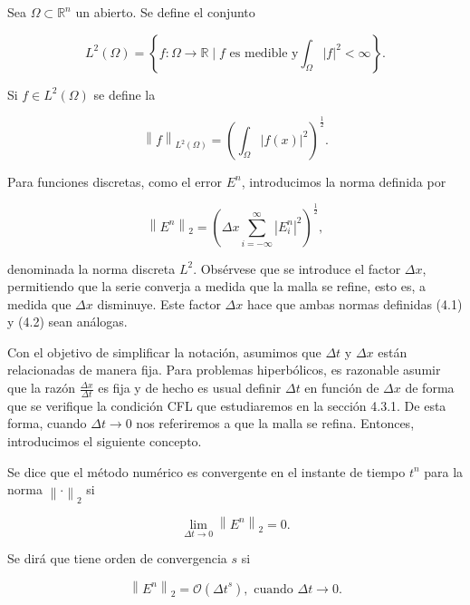 \begin{definition}
  Sea $\Omega\subset\mathbb{R}^{n}$ un abierto.
  Se define el conjunto

  \begin{equation*}
    L^{2}\left(\Omega\right)=
    \left\{
    f\colon\Omega\to\mathbb{R}\mid
    f\text{ es medible y}
    \int_{\Omega}\left|f\right|^{2}<\infty
    \right\}.
  \end{equation*}

  Si $f\in L^{2}\left(\Omega\right)$ se define la

  \begin{equation*}
    {\left\|f\right\|}_{L^{2}\left(\Omega\right)}=
      {\left(
        \int_{\Omega}
        \left|f\left(x\right)\right|^{2}
        \right)}^{\frac{1}{2}}.
  \end{equation*}
\end{definition}

Para funciones discretas, como el error $E^{n}$, introducimos la
norma definida por

\begin{equation*}
  {\left\|E^{n}\right\|}_{2}=
    {
      \left(
      \Delta x
      \sum_{i=-\infty}^{\infty}
      {\left|E^{n}_{i}\right|}^{2}
      \right)
    }^{\frac{1}{2}},
\end{equation*}

denominada la norma discreta $L^{2}$.
Obsérvese que se introduce el factor $\Delta x$, permitiendo que la
serie converja a medida que la malla se refine, esto es, a medida que
$\Delta x$ disminuye.
Este factor $\Delta x$ hace que ambas normas definidas (4.1) y (4.2)
sean análogas.

Con el objetivo de simplificar la notación, asumimos que $\Delta t$ y
$\Delta x$ están relacionadas de manera fija.
Para problemas hiperbólicos, es razonable asumir que la razón
\begin{math}
  \frac{\Delta x}{\Delta t}
\end{math}
es fija y de hecho es usual definir $\Delta t$ en función de
$\Delta x$ de forma que se verifique la condición CFL que
estudiaremos en la sección 4.3.1.
De esta forma, cuando $\Delta t\to 0$ nos referiremos a que la malla
se refina.
Entonces, introducimos el siguiente concepto.

\begin{definition}
  Se dice que el método numérico es convergente en el instante de
  tiempo $t^{n}$ para la norma ${\left\|\cdot\right\|}_{2}$ si

  \begin{equation*}
    \lim_{\Delta t\to0}
    {\left\|E^{n}\right\|}_{2}=
    0.
  \end{equation*}

  Se dirá que tiene orden de convergencia $s$ si

  \begin{equation*}
    \left\|
    E^{n}
    \right\|_{2}=
    \mathcal{O}
    \left({\Delta t}^{s}\right),
    \text{ cuando }
    \Delta t\to 0.
  \end{equation*}
\end{definition}

